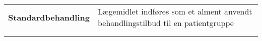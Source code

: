 \begin{table}[H]
\begin{tabular}{p{4.5cm} p{9.8cm}}
\textbf{Standardbehandling} & Lægemidlet indføres som et alment anvendt behandlingstilbud til en patientgruppe\vspace{0.5cm} \\
& \vspace{0.5cm} \\
& \vspace{0.5cm} \\
\end{tabular}
\end{table}


